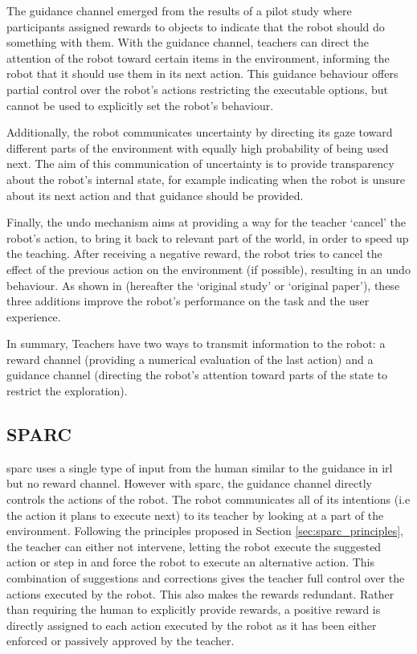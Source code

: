 The guidance channel emerged from the results of a pilot study where participants assigned rewards to objects to indicate that the robot should do something with them. With the guidance channel, teachers can direct the attention of the robot toward certain items in the environment, informing the robot that it should use them in its next action. This guidance behaviour offers partial control over the robot's actions restricting the executable options, but cannot be used to explicitly set the robot's behaviour. 

Additionally, the robot communicates uncertainty by directing its gaze toward different parts of the environment with equally high probability of being used next. The aim of this communication of uncertainty is to provide transparency about the robot's internal state, for example indicating when the robot is unsure about its next action and that guidance should be provided. 

Finally, the undo mechanism aims at providing a way for the teacher `cancel' the robot's action, to bring it back to relevant part of the world, in order to speed up the teaching. After receiving a negative reward, the robot tries to cancel the effect of the previous action on the environment (if possible), resulting in an undo behaviour. As shown in \cite{thomaz2008teachable} (hereafter the `original study' or `original paper'), these three additions improve the robot's performance on the task and the user experience.

In summary, Teachers have two ways to transmit information to the robot: a reward channel (providing a numerical evaluation of the last action) and a guidance channel (directing the robot's attention toward parts of the state to restrict the exploration).


\subsection{SPARC}

\gls{sparc} uses a single type of input from the human similar to the guidance in \gls{irl} but no reward channel. However with \gls{sparc}, the guidance channel directly controls the actions of the robot. The robot communicates all of its intentions (i.e the action it plans to execute next) to its teacher by looking at a part of the environment. Following the principles proposed in Section \ref{sec:sparc_principles}, the teacher can either not intervene, letting the robot execute the suggested action or step in and force the robot to execute an alternative action. This combination of suggestions and corrections gives the teacher full control over the actions executed by the robot. This also makes the rewards redundant. Rather than requiring the human to explicitly provide rewards, a positive reward is directly assigned to each action executed by the robot as it has been either enforced or passively approved by the teacher.


